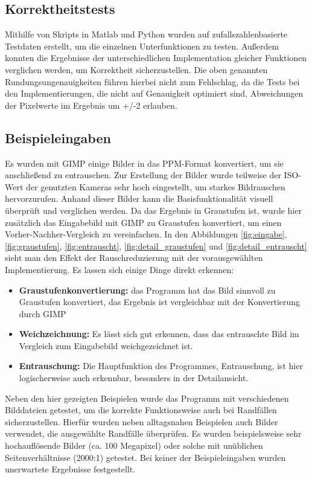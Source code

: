 \documentclass[course=erap]{aspdoc}
\begin{document}
\subsection{Korrektheitstests}
Mithilfe von Skripts in Matlab und Python wurden auf zufallszahlenbasierte Testdaten erstellt, um die einzelnen Unterfunktionen zu testen. Außerdem konnten die Ergebnisse der unterschiedlichen Implementation gleicher Funktionen verglichen werden, um Korrektheit sicherzustellen. Die oben genannten Rundungsungenauigkeiten führen hierbei nicht zum Fehlschlag, da die Tests bei den Implementierungen, die nicht auf Genauigkeit optimiert sind, Abweichungen der Pixelwerte im Ergebnis um +/-2 erlauben.

\subsection{Beispieleingaben}
Es wurden mit GIMP einige Bilder in das PPM-Format konvertiert, um sie anschließend zu entrauschen. Zur Erstellung der Bilder wurde teilweise der ISO-Wert der genutzten Kameras sehr hoch eingestellt, um starkes Bildrauschen hervorzurufen. Anhand dieser Bilder kann die Basisfunktionalität visuell überprüft und verglichen werden.
Da das Ergebnis in Graustufen ist, wurde hier zusätzlich das Eingabebild mit GIMP zu Graustufen konvertiert, um einen Vorher-Nachher-Vergleich zu vereinfachen.\newline
In den Abbildungen \ref{fig:eingabe}, \ref{fig:graustufen}, \ref{fig:entrauscht}, \ref{fig:detail_graustufen} und \ref{fig:detail_entrauscht}
sieht man den Effekt der Rauschreduzierung mit der vorausgewählten Implementierung. Es lassen sich einige Dinge direkt erkennen:
\begin{itemize}
\item \textbf{Graustufenkonvertierung:} das Programm hat das Bild sinnvoll zu Graustufen konvertiert, das Ergebnis ist vergleichbar mit der Konvertierung durch GIMP 

\item \textbf{Weichzeichnung:} Es lässt sich gut erkennen, dass das entrauschte Bild im Vergleich zum Eingabebild weichgezeichnet ist.

\item \textbf{Entrauschung:} Die Hauptfunktion des Programmes, Entrauschung, ist hier logischerweise auch erkennbar, besonders in der Detailansicht.
\end{itemize}
Neben den hier gezeigten Beispielen wurde das Programm mit verschiedenen Bilddateien getestet, um die korrekte Funktionsweise auch bei Randfällen sicherzustellen. Hierfür wurden neben alltagsnahen Beispielen auch Bilder verwendet, die ausgewählte Randfälle überprüfen. Es wurden beispielsweise sehr hochauflösende Bilder (ca. 100 Megapixel) oder solche mit unüblichen Seitenverhältnisse (2000:1) getestet. 
Bei keiner der Beispieleingaben wurden unerwartete Ergebnisse festgestellt.
\end{document}
